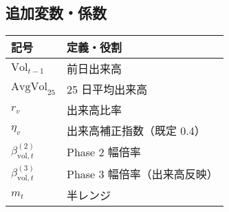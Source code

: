 \subsection*{追加変数・係数}
\begin{flushleft}
\begin{minipage}{0.88\textwidth}
\begin{tabularx}{\textwidth}{@{}lX@{}}
\toprule
記号 & 定義・役割 \\
\midrule
\(\text{Vol}_{t-1}\) & 前日出来高 \\
\(\text{AvgVol}_{25}\) & 25 日平均出来高 \\
\(r_v\) & 出来高比率 \\
\(\eta_v\) & 出来高補正指数（既定 0.4） \\
\(\beta_{\text{vol},t}^{(2)}\) & Phase 2 幅倍率 \\
\(\beta_{\text{vol},t}^{(3)}\) & Phase 3 幅倍率（出来高反映） \\
\(m_t\) & 半レンジ \\
\bottomrule
\end{tabularx}
\end{minipage}
\end{flushleft}
